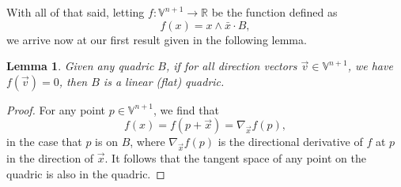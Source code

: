 \documentclass{ecgd-l}
\newtheorem{lemma}[theorem]{Lemma}
\theoremstyle{definition}
\theoremstyle{remark}
\numberwithin{equation}{section}
\newcommand{\V}{\mathbb{V}}
\newcommand{\R}{\mathbb{R}}
\begin{document}
With all of that said, letting $f:\V^{n+1}\to\R$ be the function defined as
\begin{equation}
f(x) = x\wedge\bar{x}\cdot B,
\end{equation}
we arrive now at our first result given in the following lemma.
\begin{lemma}
Given any quadric $B$, if for all direction vectors $\vec{v}\in\V^{n+1}$,
we have $f(\vec{v})=0$, then $B$ is a linear (flat) quadric.
\end{lemma}
\begin{proof}
For any point $p\in\V^{n+1}$, we find that
\begin{equation}
f(x) = f(p+\vec{x}) = \nabla_{\vec{x}}f(p),
\end{equation}
in the case that $p$ is on $B$, where $\nabla_{\vec{x}}f(p)$ is the directional
derivative of $f$ at $p$ in the direction of $\vec{x}$.  It follows that the tangent
space of any point on the quadric is also in the quadric.
\end{proof}




\end{document}
